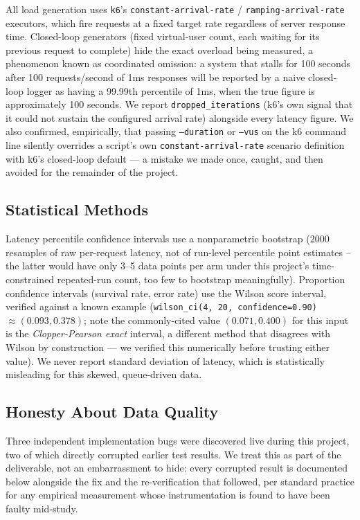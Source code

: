 \documentclass[11pt]{article}
\begin{document}
All load generation uses \texttt{k6}'s \texttt{constant-arrival-rate} /
\texttt{ramping-arrival-rate} executors, which fire requests at a fixed target
rate regardless of server response time. Closed-loop generators (fixed
virtual-user count, each waiting for its previous request to complete) hide
the exact overload being measured, a phenomenon known as coordinated omission:
a system that stalls for 100 seconds after 100 requests/second of 1ms
responses will be reported by a naive closed-loop logger as having a 99.99th
percentile of 1ms, when the true figure is approximately 100 seconds. We
report \texttt{dropped\_iterations} (k6's own signal that it could not sustain
the configured arrival rate) alongside every latency figure. We also confirmed,
empirically, that passing \texttt{--duration} or \texttt{--vus} on the k6
command line silently overrides a script's own \texttt{constant-arrival-rate}
scenario definition with k6's closed-loop default --- a mistake we made once,
caught, and then avoided for the remainder of the project.

\subsection{Statistical Methods}

Latency percentile confidence intervals use a nonparametric bootstrap
(2000 resamples of raw per-request latency, not of run-level percentile point
estimates -- the latter would have only 3--5 data points per arm under this
project's time-constrained repeated-run count, too few to bootstrap
meaningfully). Proportion confidence intervals (survival rate, error rate) use
the Wilson score interval, verified against a known example
(\texttt{wilson\_ci(4, 20, confidence=0.90)} $\approx (0.093, 0.378)$; note the
commonly-cited value $(0.071, 0.400)$ for this input is the
\emph{Clopper-Pearson exact} interval, a different method that disagrees with
Wilson by construction --- we verified this numerically before trusting either
value). We never report standard deviation of latency, which is statistically
misleading for this skewed, queue-driven data.

\subsection{Honesty About Data Quality}

Three independent implementation bugs were discovered live during this
project, two of which directly corrupted earlier test results. We treat this
as part of the deliverable, not an embarrassment to hide: every corrupted
result is documented below alongside the fix and the re-verification that
followed, per standard practice for any empirical measurement whose
instrumentation is found to have been faulty mid-study.
\end{document}
